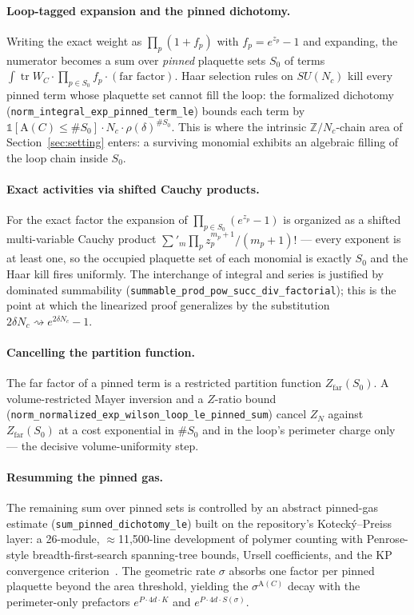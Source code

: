 \documentclass[11pt]{article}
\theoremstyle{remark}
\newcommand{\tr}{\operatorname{tr}}
\newcommand{\loopsupp}{P}
\newcommand{\Area}{\mathrm{A}}
\begin{document}
\paragraph{Loop-tagged expansion and the pinned dichotomy.}
Writing the exact weight as $\prod_p (1 + f_p)$ with
$f_p = e^{z_p} - 1$ and expanding, the numerator becomes a sum over
\emph{pinned} plaquette sets $S_0$ of terms
$\int \tr W_C \cdot \prod_{p \in S_0} f_p \cdot (\text{far factor})$.
Haar selection rules on $SU(N_c)$ kill every pinned term whose plaquette
set cannot fill the loop: the formalized dichotomy
(\texttt{norm\_integral\_exp\_pinned\_term\_le}) bounds each term by
$\mathbb{1}[\Area(C) \le \#S_0] \cdot N_c \cdot \rho(\delta)^{\#S_0}$.
This is where the intrinsic $\mathbb{Z}/N_c$-chain area of
Section~\ref{sec:setting} enters: a surviving monomial exhibits an
algebraic filling of the loop chain inside $S_0$.

\paragraph{Exact activities via shifted Cauchy products.}
For the exact factor the expansion of $\prod_{p\in S_0}(e^{z_p}-1)$ is
organized as a shifted multi-variable Cauchy product
$\sum'_{m} \prod_p z_p^{m_p+1}/(m_p+1)!$ --- every exponent is at least
one, so the occupied plaquette set of each monomial is exactly $S_0$ and
the Haar kill fires uniformly.  The interchange of integral and series is
justified by dominated summability
(\texttt{summable\_prod\_pow\_succ\_div\_factorial}); this is the point at
which the linearized proof generalizes by the substitution
$2\delta N_c \rightsquigarrow e^{2\delta N_c}-1$.

\paragraph{Cancelling the partition function.}
The far factor of a pinned term is a restricted partition function
$Z_{\mathrm{far}}(S_0)$.  A volume-restricted Mayer inversion and a
$Z$-ratio bound
(\texttt{norm\_normalized\_exp\_wilson\_loop\_le\_pinned\_sum}) cancel
$Z_N$ against $Z_{\mathrm{far}}(S_0)$ at a cost exponential in
$\#S_0$ and in the loop's perimeter charge only --- the decisive
volume-uniformity step.

\paragraph{Resumming the pinned gas.}
The remaining sum over pinned sets is controlled by an abstract pinned-gas
estimate (\texttt{sum\_pinned\_dichotomy\_le}) built on the repository's
Koteck\'y--Preiss layer: a 26-module, $\approx$11{,}500-line development
of polymer counting with Penrose-style breadth-first-search spanning-tree
bounds, Ursell coefficients, and the KP convergence
criterion~\cite{Penrose1967,KoteckyPreiss1986}.  The geometric rate
$\sigma$ absorbs one factor per pinned plaquette beyond the area threshold,
yielding the $\sigma^{\Area(C)}$ decay with the perimeter-only prefactors
$e^{\loopsupp\cdot 4d\cdot K}$ and $e^{\loopsupp\cdot 4d\cdot S(\sigma)}$.
\end{document}
